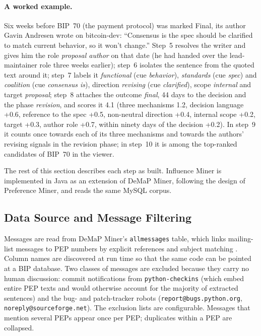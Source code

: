 \documentclass[sigconf,screen]{acmart}
\begin{document}
\paragraph{A worked example.} Six weeks before BIP~70 (the payment protocol) was marked Final, its author Gavin Andresen wrote on bitcoin-dev: ``Consensus is the spec should be clarified to match current behavior, so it won't change.'' Step~5 resolves the writer and gives him the role \emph{proposal author} on that date (he had handed over the lead-maintainer role three weeks earlier); step~6 isolates the sentence from the quoted text around it; step~7 labels it \emph{functional} (cue \emph{behavior}), \emph{standards} (cue \emph{spec}) and \emph{coalition} (cue \emph{consensus is}), direction \emph{revising} (cue \emph{clarified}), scope \emph{internal} and target \emph{proposal}; step~8 attaches the outcome \emph{final}, 44 days to the decision and the phase \emph{revision}, and scores it 4.1 (three mechanisms 1.2, decision language +0.6, reference to the spec +0.5, non-neutral direction +0.4, internal scope +0.2, target +0.3, author role +0.7, within ninety days of the decision +0.2). In step~9 it counts once towards each of its three mechanisms and towards the authors' revising signals in the revision phase; in step~10 it is among the top-ranked candidates of BIP~70 in the viewer.

The rest of this section describes each step as built. Influence Miner is implemented in Java as an extension of DeMaP Miner, following the design of Preference Miner, and reads the same MySQL corpus.

\subsection{Data Source and Message Filtering}
\label{sec:filtering}

Messages are read from DeMaP Miner's \texttt{allmessages} table, which links mailing-list messages to PEP numbers by explicit references and subject matching \cite{sharma2022demap}. Column names are discovered at run time so that the same code can be pointed at a BIP database. Two classes of messages are excluded because they carry no human discussion: commit notifications from \texttt{python-checkins} (which embed entire PEP texts and would otherwise account for the majority of extracted sentences) and the bug- and patch-tracker robots (\texttt{report@bugs.python.org}, \texttt{noreply@sourceforge.net}). The exclusion lists are configurable. Messages that mention several PEPs appear once per PEP; duplicates within a PEP are collapsed.
\end{document}
